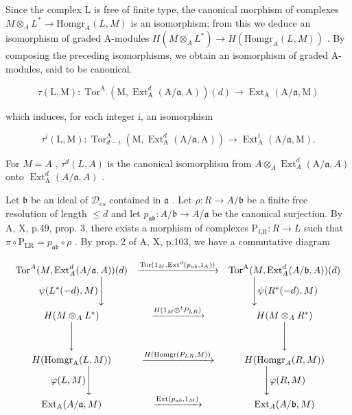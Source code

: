 Since the complex L is free of finite type, the canonical morphism of complexes \(M \otimes_{A} L^{*} \to \text{Homgr}_{A}(L, M)\) is an isomorphism; from this we deduce an isomorphism of graded A-modules \(H(M \otimes_{A} L^{*}) \to H(\text{Homgr}_{A}(L, M))\) . By composing the preceding isomorphisms, we obtain an isomorphism of graded A-modules, said to be canonical.

\[
\tau (\mathrm{L}, \mathrm{M}): \operatorname{Tor} ^ {\mathrm{A}} (\mathrm{M}, \operatorname{Ext} _ {\mathrm{A}} ^ {d} (\mathrm{A} / \mathfrak {a}, \mathrm{A})) (d) \longrightarrow \operatorname{Ext} _ {\mathrm{A}} (\mathrm{A} / \mathfrak {a}, \mathrm{M})
\]

which induces, for each integer i, an isomorphism

\[
\tau^ {i} (\mathrm{L}, \mathrm{M}): \operatorname{Tor} _ {d - i} ^ {\mathrm{A}} (\mathrm{M}, \operatorname{Ext} _ {\mathrm{A}} ^ {d} (\mathrm{A} / \mathfrak {a}, \mathrm{A})) \longrightarrow \operatorname{Ext} _ {\mathrm{A}} ^ {i} (\mathrm{A} / \mathfrak {a}, \mathrm{M}).
\]

For \(M = A\) , \(\tau^d(L, A)\) is the canonical isomorphism from \(A \otimes_A \operatorname{Ext}_A^d(\mathrm{A} / \mathfrak{a}, A)\) onto \(\operatorname{Ext}_\mathrm{A}^d(A / \mathfrak{a}, A)\) .

Let \(\mathfrak{b}\) be an ideal of \(\mathcal{D}_{cs}\) contained in \(\mathfrak{a}\) . Let \(\rho: R \to A/\mathfrak{b}\) be a finite free resolution of length \(\leqslant d\) and let \(p_{\mathfrak{ab}}: A/\mathfrak{b} \to A/\mathfrak{a}\) be the canonical surjection. By A, X, p.49, prop. 3, there exists a morphism of complexes \(\mathrm{P}_{\mathrm{LR}}: R \to L\) such that \(\pi \circ \mathrm{P}_{\mathrm{LR}} = p_{\mathfrak{ab}} \circ \rho\) . By prop. 2 of A, X, p.103, we have a commutative diagram

\[
\begin{array}{c c c} \operatorname{Tor} ^ {A} (M, \operatorname{Ext} _ {A} ^ {d} (A / \mathfrak {a}, A)) (d) & \xrightarrow {\operatorname{Tor} (1 _ {M} , \operatorname{Ext} ^ {d} (p _ {a b} , 1 _ {\mathrm{A}}))} & \operatorname{Tor} ^ {\mathrm{A}} (M, \operatorname{Ext} _ {A} ^ {d} (A / \mathfrak {b}, A)) (d) \\ \psi (L ^ {*} (- d), M) \Bigg \downarrow & & \Bigg \downarrow \psi (R ^ {*} (- d), M) \\ H (M \otimes_ {A} L ^ {*}) & \xrightarrow {H (1 _ {M} \otimes^ {t} P _ {L R})} & H (M \otimes_ {A} R ^ {*}) \\ \Bigg \downarrow & & \Bigg \downarrow \\ H (\operatorname{Homgr} _ {\mathrm{A}} (L, M)) & \xrightarrow {H (\operatorname{Homgr} (P _ {L R} , M))} & H (\operatorname{Homgr} _ {A} (R, M)) \\ \varphi (L, M) \Bigg \downarrow & & \Bigg \downarrow \varphi (R, M) \\ \operatorname{Ext} _ {\mathrm{A}} (A / \mathfrak {a}, M) & \xrightarrow {\operatorname{Ext} (p _ {a b} , 1 _ {M})} & \operatorname{Ext} _ {A} (A / \mathfrak {b}, M) \end{array}
\]


